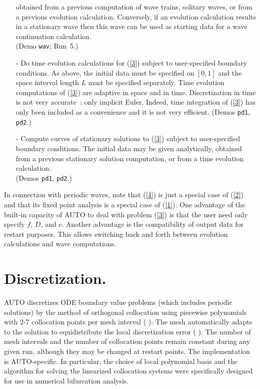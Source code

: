 \documentclass[12pt]{report}
\begin{document}
\begin{itemize}
  obtained from a previous computation of wave trains, solitary
  waves, or from a previous evolution calculation.
  Conversely, if an evolution calculation results in a
  stationary wave then this wave can be used as starting data
  for a wave continuation calculation.\\
  (Demo {\tt wav}; Run~5.)
\item[-]
  Do time evolution calculations for (\ref{3}) subject to user-specified
  boundary conditions.
  As above, the initial data must be specified on $[0,1]$ and the space
  interval length $L$ must be specified separately.
  Time evolution computations of (\ref{3}) are adaptive in space and
  in time. Discretization in time is not very accurate~: only
  implicit Euler. Indeed, time integration of (\ref{3}) has only been
  included as a convenience and it is not very efficient.
  (Demos {\tt pd1}, {\tt pd2}.)
\item[-]
  Compute curves of stationary solutions to (\ref{3}) subject to user-specified
  boundary conditions.
  The initial data may be given analytically, obtained from a previous 
  stationary solution computation, or from a time evolution calculation.\\
  (Demos {\tt pd1}, {\tt pd2}.)
\end{itemize}
 
In connection with periodic waves,
note that (\ref{4}) is just a special case of (\ref{2}) and
that its fixed point analysis is a special case of (\ref{1}).
One advantage of the built-in capacity of {\cal AUTO} to deal with
problem (\ref{3}) is that the user need only specify $f$, $D$, and $c$.
Another advantage is the compatibility of output data for
restart purposes. This allows switching back and forth between
evolution calculations and wave computations.

\section{ Discretization.} \label{sec:Discretization}
  {\cal AUTO} discretizes ODE boundary value problems
  (which includes periodic solutions) by the method of orthogonal 
  collocation using piecewise polynomials with 2-7 collocation points 
  per mesh interval ( \citeyear{dBSw:73}).
  The mesh automatically adapts to the solution to equidistribute
  the local discretization error ( \citeyear{RuCr:78}).
  The number of mesh intervals and the number of collocation points
  remain constant during any given run, although they may be changed 
  at restart points.
  The implementation is {\cal AUTO}-specific. In particular, the choice of
  local polynomial basis
  and the algorithm for solving the linearized collocation systems
  were specifically designed for use in numerical bifurcation analysis.
  
\end{document}
